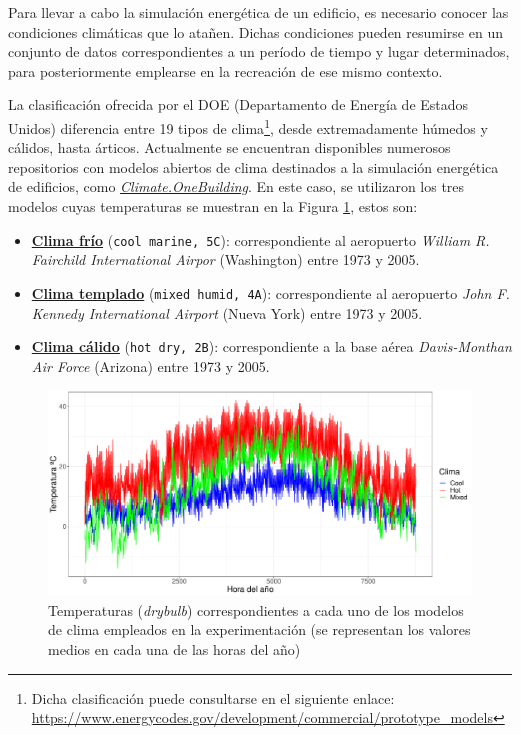 Para llevar a cabo la simulación energética de un edificio, es necesario conocer las condiciones climáticas que lo atañen. Dichas condiciones pueden resumirse en un conjunto de datos correspondientes a un período de tiempo y lugar determinados, para posteriormente emplearse en la recreación de ese mismo contexto. 

La clasificación ofrecida por el DOE (Departamento de Energía de Estados Unidos) diferencia entre 19 tipos de clima\footnote{Dicha clasificación puede consultarse en el siguiente enlace: \url{https://www.energycodes.gov/development/commercial/prototype_models}}, desde extremadamente húmedos y cálidos, hasta árticos. Actualmente se encuentran disponibles numerosos repositorios con modelos abiertos de clima destinados a la simulación energética de edificios, como \href{http://climate.onebuilding.org/}{\textit{Climate.OneBuilding}}. En este caso, se utilizaron los tres modelos cuyas temperaturas se muestran en la Figura \ref{fig:weathers}, estos son:

\begin{itemize}
    \item \textbf{\href{https://www.energycodes.gov/sites/default/files/documents/USA_WA_Port.Angeles-William.R.Fairchild.Intl.AP.727885_TMY3.epw}{Clima frío}} (\texttt{cool marine, 5C}): correspondiente al aeropuerto \textit{William R. Fairchild International Airpor} (Washington) entre 1973 y 2005.
    \item \textbf{\href{https://www.energycodes.gov/sites/default/files/documents/USA_NY_New.York-John.F.Kennedy.Intl.AP.744860_TMY3.epw}{Clima templado}} (\texttt{mixed humid, 4A}): correspondiente al aeropuerto \textit{John F. Kennedy International Airport} (Nueva York) entre 1973 y 2005.
    \item \textbf{\href{https://www.energycodes.gov/sites/default/files/documents/USA_AZ_Tucson-Davis-Monthan.AFB.722745_TMY3.epw}{Clima cálido}} (\texttt{hot dry, 2B}): correspondiente a la base aérea \textit{Davis-Monthan Air Force} (Arizona) entre 1973 y 2005.
\end{itemize}

\begin{figure}
    \centering
    \includegraphics[width=\textwidth]{imagenes/weathers.pdf}
    \caption{Temperaturas (\textit{drybulb}) correspondientes a cada uno de los modelos de clima empleados en la experimentación (se representan los valores medios en cada una de las horas del año)}
    \label{fig:weathers}
\end{figure}

